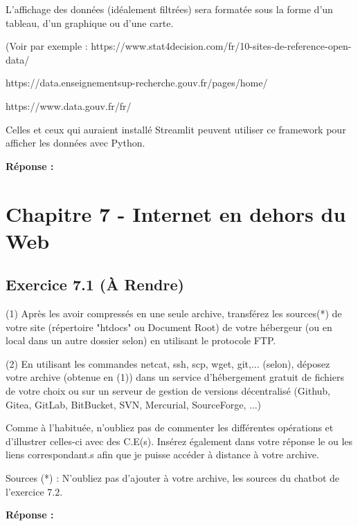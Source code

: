 \documentclass[11pt]{article}
\begin{document}
L’affichage des données (idéalement filtrées) sera formatée sous la forme d’un tableau, d’un graphique ou d’une carte.

(Voir par exemple : https://www.stat4decision.com/fr/10-sites-de-reference-open-data/

https://data.enseignementsup-recherche.gouv.fr/pages/home/

https://www.data.gouv.fr/fr/

Celles et ceux qui auraient installé Streamlit peuvent utiliser ce framework pour afficher les données avec Python.

\textbf{Réponse :}


\section*{Chapitre 7 - Internet en dehors du Web}

	\subsection*{Exercice 7.1 (À Rendre)}
	
(1) Après les avoir compressés en une seule archive, transférez les sources(*) de votre site (répertoire "htdocs" ou Document Root) de votre hébergeur (ou en local dans un autre dossier selon) en utilisant le protocole FTP.

(2) En utilisant les commandes netcat, ssh, scp, wget, git,... (selon), déposez votre archive (obtenue en (1)) dans un service d’hébergement gratuit de fichiers de votre choix ou sur un serveur de gestion de versions décentralisé (Github, Gitea, GitLab, BitBucket, SVN, Mercurial, SourceForge, ...)

Comme à l’habituée, n’oubliez pas de commenter les différentes opérations et d’illustrer celles-ci avec des C.E(s). Insérez également dans votre réponse le ou les liens correspondant.s afin que je puisse accéder à distance à votre archive.

Sources (*) : N’oubliez pas d’ajouter à votre archive, les sources du chatbot de l’exercice 7.2.

\textbf{Réponse :}
 
\end{document}
